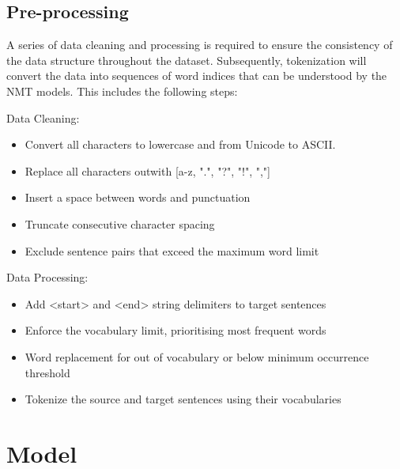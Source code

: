 \subsection{Pre-processing}

A series of data cleaning and processing is required to ensure the consistency of the data structure throughout the dataset. Subsequently, tokenization will convert the data into sequences of word indices that can be understood by the \acrshort{NMT} models. This includes the following steps:

Data Cleaning:
\begin{itemize}
    \item Convert all characters to lowercase and from Unicode to ASCII. %
    \item Replace all characters outwith [a-z, ".", "?", "!", ","]
    \item Insert a space between words and punctuation
    \item Truncate consecutive character spacing
    \item Exclude sentence pairs that exceed the maximum word limit
\end{itemize}

Data Processing:
\begin{itemize}
    \item Add <start> and <end> string delimiters to target sentences
    \item Enforce the vocabulary limit, prioritising most frequent words
    \item Word replacement for out of vocabulary or below minimum occurrence threshold
    \item Tokenize the source and target sentences using their vocabularies
\end{itemize}

\section{Model}
\label{sec:3-model}





